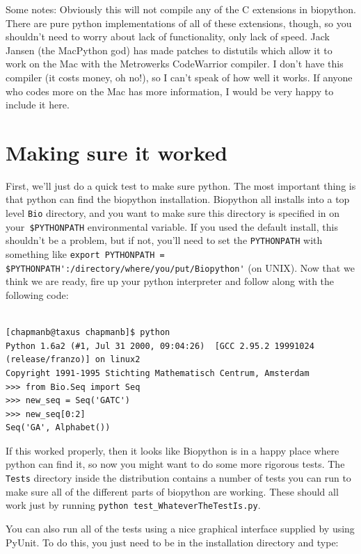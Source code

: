 \documentclass{report}
\begin{document}
Some notes: Obviously this will not compile any of the C extensions in biopython. There are pure python implementations of all of these extensions, though, so you shouldn't need to worry about lack of functionality, only lack of speed. Jack Jansen (the MacPython god) has made patches to distutils which allow it to work on the Mac with the Metrowerks CodeWarrior compiler. I don't have this compiler (it costs money, oh no!), so I can't speak of how well it works. If anyone who codes more on the Mac has more information, I would be very happy to include it here.

\section{Making sure it worked}
\label{sec:is_working}

First, we'll just do a quick test to make sure python. The most important thing is that python can find the biopython installation. Biopython all installs into a top level \verb|Bio| directory, and you want to make sure this directory is specified in on your\verb| $PYTHONPATH| environmental variable. If you used the default install, this shouldn't be a problem, but if not, you'll need to set the \verb|PYTHONPATH| with something like \verb|export PYTHONPATH = $PYTHONPATH':/directory/where/you/put/Biopython'| (on UNIX). Now that we think we are ready, fire up your python interpreter and follow along with the following code:

\begin{verbatim}

[chapmanb@taxus chapmanb]$ python
Python 1.6a2 (#1, Jul 31 2000, 09:04:26)  [GCC 2.95.2 19991024 (release/franzo)] on linux2
Copyright 1991-1995 Stichting Mathematisch Centrum, Amsterdam
>>> from Bio.Seq import Seq
>>> new_seq = Seq('GATC') 
>>> new_seq[0:2]
Seq('GA', Alphabet())

\end{verbatim}%

If this worked properly, then it looks like Biopython is in a happy place where python can find it, so now you might want to do some more rigorous tests. The \verb|Tests| directory inside the distribution contains a number of tests you can run to make sure all of the different parts of biopython are working. These should all work just by running \verb|python test_WhateverTheTestIs.py|. 


You can also run all of the tests using a nice graphical interface supplied by using PyUnit. To do this, you just need to be in the installation directory and type:
\end{document}
